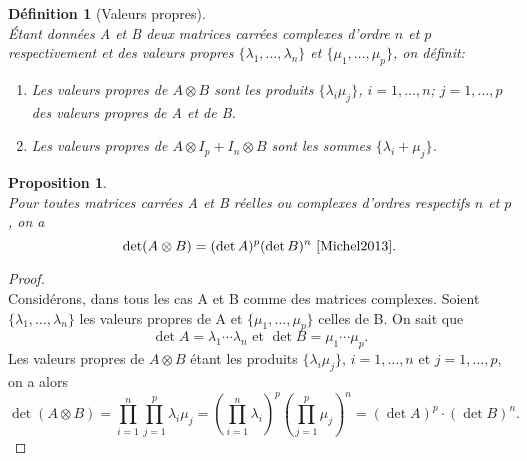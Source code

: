\documentclass[11pt,a4paper,oneside]{book}
\newtheorem{prop}{Proposition}[chapter]
\newtheorem{defi}{Définition}[chapter]
\newtheorem{proof}{Démonstration}
\def\R{\mathbb R}
\newcommand{\mbf}[1]{\mathbf{#1}}
\newcommand{\figref}[1]{\textsc{Figure}~\ref{#1}}
\begin{document}
\begin{defi}[Valeurs propres]
	\emph{\\}
	Étant données  A et B  deux matrices carrées complexes d'ordre $ n $ et $ p $ respectivement et des valeurs propres $ \{\lambda_{1},\dots,\lambda_{n}\} $ et $ \{\mu_{1},\dots,\mu_{p}\} $, on définit:
	\begin{enumerate}
		\item[$ (1) $] Les valeurs propres de $ A\otimes B $ sont les produits $ \{\lambda_{i}\mu_{j}\} $, $ i=1,\dots,n $; $ j=1,\dots,p $ des valeurs propres de A et de B.
		\item[$ (2) $] Les valeurs propres de $ A\otimes I_{p} +I_{n}\otimes B$ sont les sommes $ \{\lambda_{i}+\mu_{j}\} $.
	\end{enumerate}
\end{defi}
\begin{prop}
	\emph{\\}
	Pour toutes matrices carrées A et B réelles ou complexes d'ordres respectifs $ n $ et $ p $, on a\begin{equation}
	\det(A\otimes B)=(\det A)^{p}(\det B)^{n}\text{ \cite[p.121]{Michel2013}}.
	\end{equation}
\end{prop}
\begin{proof}
	\emph{\\}
	Considérons, dans tous les cas A et B comme des matrices complexes. Soient $ \{\lambda_{1},\dots,\lambda_{n}\} $ les valeurs propres de A et $ \{\mu_{1},\dots,\mu_{p}\} $ celles de B. On sait que $$\det A=\lambda_{1}\cdots\lambda_{n}\text{ et }\det B=\mu_{1}\cdots\mu_{p}.$$
	Les valeurs propres de $ A\otimes B $ étant les produits $ \{\lambda_{i}\mu_{j}\} $, $ i=1,\dots,n $ et $ j=1,\dots,p $, on a alors\begin{equation*}
	\det(A\otimes B)=\prod_{i=1}^{n}\prod_{j=1}^{p}\lambda_{i}\mu_{j}=\left(\prod_{i=1}^{n}\lambda_{i}\right)^{p}\left(\prod_{j=1}^{p}\mu_{j}\right)^{n}=(\det A)^{p}\cdot (\det B)^{n}.
	\end{equation*}
\end{proof}

\end{document}
